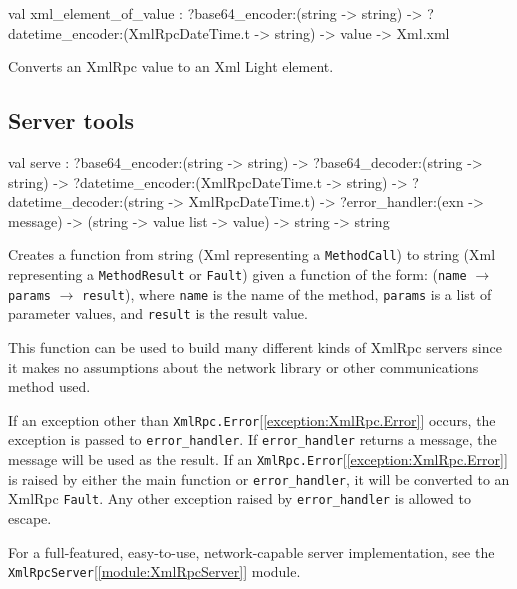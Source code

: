 \documentclass[11pt]{article}
\begin{document}
\label{val:XmlRpc.xml-underscoreelement-underscoreof-underscorevalue}\begin{ocamldoccode}
val xml_element_of_value :
  ?base64_encoder:(string -> string) ->
  ?datetime_encoder:(XmlRpcDateTime.t -> string) -> value -> Xml.xml
\end{ocamldoccode}
\begin{ocamldocdescription}
Converts an XmlRpc value to an Xml Light element.


\end{ocamldocdescription}




\subsection{Server tools}




\label{val:XmlRpc.serve}\begin{ocamldoccode}
val serve :
  ?base64_encoder:(string -> string) ->
  ?base64_decoder:(string -> string) ->
  ?datetime_encoder:(XmlRpcDateTime.t -> string) ->
  ?datetime_decoder:(string -> XmlRpcDateTime.t) ->
  ?error_handler:(exn -> message) ->
  (string -> value list -> value) -> string -> string
\end{ocamldoccode}
\begin{ocamldocdescription}
Creates a function from string (Xml representing a {\tt{MethodCall}}) to
    string (Xml representing a {\tt{MethodResult}} or {\tt{Fault}}) given a function
    of the form: ({\tt{name}} $\rightarrow$ {\tt{params}} $\rightarrow$ {\tt{result}}), where {\tt{name}} is the
    name of the method, {\tt{params}} is a list of parameter values, and
    {\tt{result}} is the result value.


    This function can be used to build many different kinds of XmlRpc
    servers since it makes no assumptions about the network library
    or other communications method used.


    If an exception other than {\tt{XmlRpc.Error}}[\ref{exception:XmlRpc.Error}] occurs, the exception is
    passed to {\tt{error\_handler}}. If {\tt{error\_handler}} returns a message,
    the message will be used as the result. If an {\tt{XmlRpc.Error}}[\ref{exception:XmlRpc.Error}] is
    raised by either the main function or {\tt{error\_handler}}, it will be
    converted to an XmlRpc {\tt{Fault}}. Any other exception raised by
    {\tt{error\_handler}} is allowed to escape.


    For a full-featured, easy-to-use, network-capable server implementation,
    see the {\tt{XmlRpcServer}}[\ref{module:XmlRpcServer}] module.


\end{ocamldocdescription}
\end{document}
